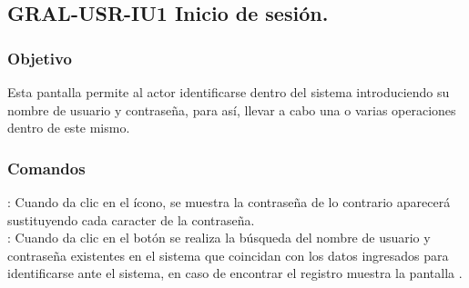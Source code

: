 \clearpage
\subsection{GRAL-USR-IU1 Inicio de sesión.}

\subsubsection{Objetivo}
	
	Esta pantalla permite al actor identificarse dentro del sistema introduciendo su nombre de usuario y contraseña, para así, llevar a cabo una o varias operaciones dentro de este mismo.\\


\subsubsection{Comandos}

\Titem \IUPass : Cuando da clic en el ícono, se muestra la contraseña de lo contrario aparecerá \IUOculto \thinspace sustituyendo cada caracter de la contraseña. \\

\Titem {} : Cuando da clic en el botón se realiza la búsqueda del nombre de usuario y contraseña existentes en el sistema que coincidan con los datos ingresados para identificarse ante el sistema, en caso de encontrar el registro muestra la pantalla . \\






\clearpage
